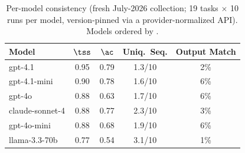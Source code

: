\begin{table}[t]
\centering
\caption{Per-model consistency (fresh July-2026 collection; 19 tasks $\times$ 10 runs
per model, version-pinned via a provider-normalized API). Models ordered by \tss.}
\label{tab:models}
\small
\begin{tabular}{lcccc}
\toprule
Model & $\tss$ & $\ac$ & Uniq.\ Seq. & Output Match \\
\midrule
gpt-4.1 & 0.95 & 0.79 & 1.3/10 & 2\% \\
gpt-4.1-mini & 0.90 & 0.78 & 1.6/10 & 6\% \\
gpt-4o & 0.88 & 0.63 & 1.7/10 & 6\% \\
claude-sonnet-4 & 0.88 & 0.77 & 2.3/10 & 3\% \\
gpt-4o-mini & 0.88 & 0.68 & 1.9/10 & 6\% \\
llama-3.3-70b & 0.77 & 0.54 & 3.1/10 & 1\% \\
\bottomrule
\end{tabular}
\end{table}
